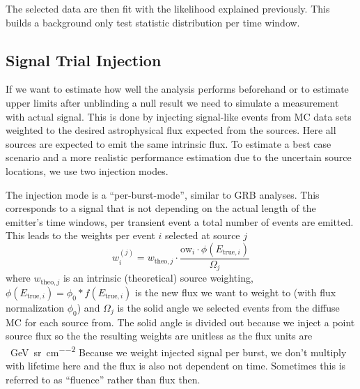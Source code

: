 The selected data are then fit with the likelihood explained previously.
This builds a background only test statistic distribution per time window.

\subsection{Signal Trial Injection}
If we want to estimate how well the analysis performs beforehand or to estimate upper limits after unblinding a null result we need to simulate a measurement with actual signal.
This is done by injecting signal-like events from MC data sets weighted to the desired astrophysical flux expected from the sources.
Here all sources are expected to emit the same intrinsic flux.
To estimate a best case scenario and a more realistic performance estimation due to the uncertain source locations, we use two injection modes.

The injection mode is a \enquote{per-burst-mode}, similar to GRB analyses.
This corresponds to a signal that is not depending on the actual length of the emitter's time windows, per transient event a total number of events are emitted.
This leads to the weights per event $i$ selected at source $j$
\begin{equation}
  w_i^{(j)} = w_{\mathrm{theo},j} \cdot
              \frac{\mathrm{ow}_i \cdot \phi(E_{\mathrm{true},i})}
                   {\Omega_j}
\end{equation}
where $w_{\mathrm{theo},j}$ is an intrinsic (theoretical) source weighting, $\phi(E_{\mathrm{true},i}) = \phi_0 * f(E_{\mathrm{true},i})$ is the new flux we want to weight to (with flux normalization $\phi_0$) and $\Omega_j$ is the solid angle we selected events from the diffuse MC for each source from.
The solid angle is divided out because we inject a point source flux so the the resulting weights are unitless as the flux units are \si{\per\GeV\per\steradian\per\cm\squared}
Because we weight injected signal per burst, we don't multiply with lifetime here and the flux is also not dependent on time.
Sometimes this is referred to as \enquote{fluence} rather than flux then.

